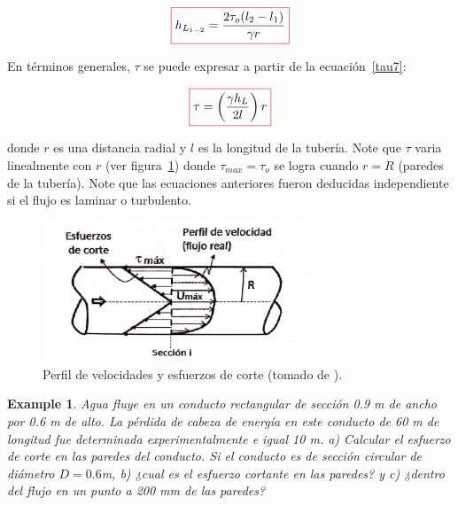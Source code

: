 \documentclass[11pt, oneside]{article}
\newtheorem{exa}{Example}
\begin{document}
\begin{equation}
\color{red}\boxed{\color{black} h_{L_{1-2}} = \frac{2\tau_o (l_2 - l_1 )}{\gamma r} } 
\label{tau7}
\end{equation}

En t\'erminos generales,  $\tau$ se puede expresar a partir de la ecuaci\'on~\ref{tau7}:
 
\begin{equation}
\color{red}\boxed{\color{black} \tau = \left( \frac{\gamma h_L }{2l} \right)r }
\label{tau8}
\end{equation}

donde $r$ es una distancia radial y $l$ es la longitud de la tuber\'ia. Note que $\tau$ varia linealmente con $r$ (ver figura~\ref{taun}) donde $\tau_{max} = \tau_o$ se logra cuando $r=R$ (paredes de la tuber\'ia). Note que las ecuaciones anteriores fueron deducidas independiente si el flujo es laminar o turbulento.  

\begin{figure}[h]
\centering
\includegraphics[width=8cm]{taun.jpeg}
\caption{Perfil de velocidades y esfuerzos de corte (tomado de \cite{agudelo2011mecanica}).}
\label{taun}
\end{figure}


\begin{shaded}
\begin{exa}
Agua fluye en un conducto rectangular de secci\'on 0.9 m de ancho por 0.6 m de alto. La p\'erdida de cabeza de energ\'ia en este conducto de 60 m de longitud fue determinada experimentalmente e igual 10 m. a) Calcular el esfuerzo de corte en las paredes del conducto. Si el conducto es de secci\'on circular de di\'ametro $D = 0.6$m, b) ¿cual es el esfuerzo cortante en las paredes? y c) ¿dentro del flujo en un punto a 200 mm de las paredes?
\end{exa}
\end{shaded}

\end{document}
